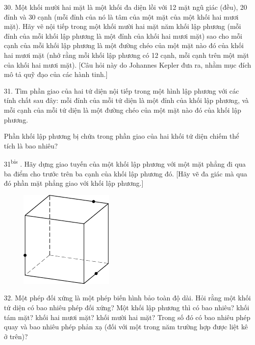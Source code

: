 \begin{problem}{30.}
	Một khối mười hai mặt là một khối đa diện lồi với 12 mặt ngũ giác (đều), 20 đỉnh và 30 cạnh (mỗi đỉnh của nó là tâm của một mặt của một khối hai mươi mặt). Hãy vẽ nội tiếp trong một khối mười hai mặt năm khối lập phương (mỗi đỉnh của mỗi khối lập phương là một đỉnh của khối hai mươi mặt) sao cho mỗi cạnh của mỗi khối lập phương là một đường chéo của một mặt  nào đó của khối hai mươi mặt (nhớ rằng mỗi khối lập phương có 12 cạnh, mỗi cạnh trên một mặt của khối hai mươi mặt). [Câu hỏi này do Johannes Kepler đưa ra, nhằm mục đích mô tả quỹ đạo của các hành tinh.]
\end{problem}

\begin{problem}{31.}
	Tìm phần giao của hai tứ diện  nội tiếp  trong một hình lập phương với các tính chất sau đây: mỗi đỉnh của mỗi  tứ diện là một đỉnh của khối lập phương, và mỗi  cạnh của mỗi  tứ diện là một đường chéo của một mặt nào đó của khối lập phương.

	Phần khối lập phương bị chứa trong phần giao của hai khối tứ diện chiếm thể tích là bao nhiêu?
\end{problem}

\begin{problem}{31\textsuperscript{bis}
	.}
	Hãy dựng giao tuyến của một khối lập phương với một mặt phẳng đi qua ba điểm cho trước trên ba cạnh của khối lập phương đó. [Hãy vẽ đa giác mà qua đó phần mặt phẳng giao với khối lập phương.]
	\begin{figure}
		\includegraphics[scale=1]{taskbook-15}
	\end{figure}
\end{problem}

\begin{problem}{32.}
	Một phép đối xứng là một phép biến hình bảo toàn độ dài.  Hỏi rằng một khối tứ diện có bao nhiêu phép đối xứng? Một khối lập phương thì có bao nhiêu? khối tám mặt? khối hai mươi mặt? khối mười hai mặt? Trong số đó có bao nhiêu phép quay và bao nhiêu phép phản xạ (đối với một trong năm trường hợp được liệt kê ở trên)?
\end{problem}

